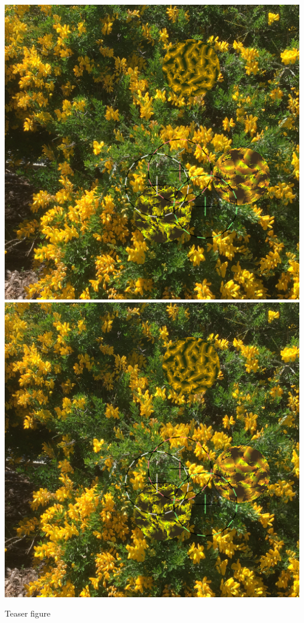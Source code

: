 \documentclass[sigconf]{acmart}
\begin{document}
\begin{teaserfigure}
    \hfill
    \includegraphics[scale=0.24]{20220930_step_6093}
    \hfill
    \includegraphics[scale=0.24]{20220930_step_6093}
    \caption{Teaser figure}
    \label{fig:teaser}
\end{teaserfigure}
\end{document}
